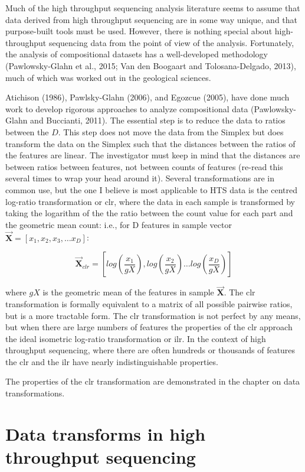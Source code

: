 \documentclass[twocolumn]{article}
\newcommand{\vect}[1]{\vec{\textbf{#1}}}
\begin{document}
Much of the high throughput sequencing analysis literature seems to
assume that data derived from high throughput sequencing are in some way
unique, and that purpose-built tools must be used. However, there is
nothing special about high-throughput sequencing data from the point of
view of the analysis. Fortunately, the analysis of compositional
datasets has a well-developed methodology (Pawlowsky-Glahn et al., 2015;
Van den Boogaart and Tolosana-Delgado, 2013), much of which was worked
out in the geological sciences.

Atichison (1986), Pawlsky-Glahn (2006), and Egozcue (2005), have done
much work to develop rigorous approaches to analyze compositional data
(Pawlowsky-Glahn and Buccianti, 2011). The essential step is to reduce
the data to ratios between the \(D\). This step does not move the data
from the Simplex but does transform the data on the Simplex such that
the distances between the ratios of the features are linear. The
investigator must keep in mind that the distances are between ratios
between features, not between counts of features (re-read this several
times to wrap your head around it). Several transformations are in
common use, but the one I believe is most applicable to HTS data is the
centred log-ratio transformation or clr, where the data in each sample
is transformed by taking the logarithm of the the ratio between the
count value for each part and the geometric mean count: i.e., for D
features in sample vector \(\vect{X} = [x_1, x_2, x_3, \ldots x_D]\):

\begin{equation}
 \vect{X}_{clr}  = [log(\frac{x_1}{gX}), log(\frac{x_2}{gX}) \ldots log(\frac{x_D}{gX})]
\end{equation}

where \(gX\) is the geometric mean of the features in sample
\(\vect{X}\). The clr transformation is formally equivalent to a matrix
of all possible pairwise ratios, but is a more tractable form. The clr
transformation is not perfect by any means, but when there are large
numbers of features the properties of the clr approach the ideal
isometric log-ratio transformation or ilr. In the context of high
throughput sequencing, where there are often hundreds or thousands of
features the clr and the ilr have nearly indistinguishable properties.

The properties of the clr transformation are demonstrated in the chapter
on data transformations.

\clearpage

\section{Data transforms in high throughput
sequencing}\label{data-transforms-in-high-throughput-sequencing}
\end{document}
